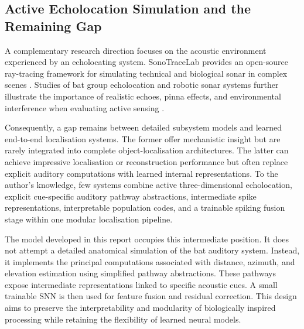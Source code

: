 \subsection{Active Echolocation Simulation and the Remaining Gap}

A complementary research direction focuses on the acoustic environment experienced by an echolocating system. SonoTraceLab provides an open-source ray-tracing framework for simulating technical and biological sonar in complex scenes \cite{Jansen2024SonoTraceLabBats}. Studies of bat group echolocation and robotic sonar systems further illustrate the importance of realistic echoes, pinna effects, and environmental interference when evaluating active sensing \cite{Mazar2026Agent-basedEmergences,Schillebeeckx2011BiomimeticPinnae}.

Consequently, a gap remains between detailed subsystem models and learned end-to-end localisation systems. The former offer mechanistic insight but are rarely integrated into complete object-localisation architectures. The latter can achieve impressive localisation or reconstruction performance but often replace explicit auditory computations with learned internal representations. To the author's knowledge, few systems combine active three-dimensional echolocation, explicit cue-specific auditory pathway abstractions, intermediate spike representations, interpretable population codes, and a trainable spiking fusion stage within one modular localisation pipeline.

The model developed in this report occupies this intermediate position. It does not attempt a detailed anatomical simulation of the bat auditory system. Instead, it implements the principal computations associated with distance, azimuth, and elevation estimation using simplified pathway abstractions. These pathways expose intermediate representations linked to specific acoustic cues. A small trainable SNN is then used for feature fusion and residual correction. This design aims to preserve the interpretability and modularity of biologically inspired processing while retaining the flexibility of learned neural models.
